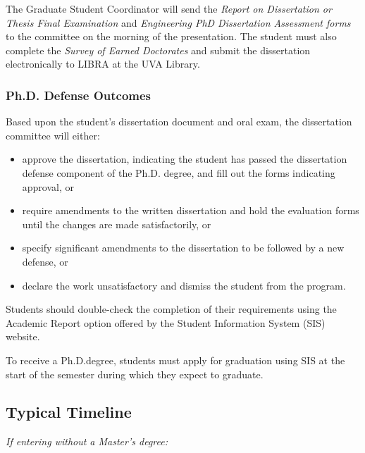The Graduate Student Coordinator will send the \emph{Report on
Dissertation or Thesis Final Examination} and \emph{Engineering PhD
Dissertation Assessment forms} to the committee on the morning of the
presentation\emph{.} The student must also complete the \emph{Survey of
Earned Doctorates} and submit the dissertation electronically to
LIBRA at the UVA Library.

\hypertarget{phd-defense-outcomes}{
\subsubsection{Ph.D. Defense Outcomes}
\label{phd-defense-outcomes}
}

Based upon the student's dissertation document and oral exam, the
dissertation committee will either:

\begin{itemize}[nosep]
\item
  approve the dissertation, indicating the student has passed the
  dissertation defense component of the Ph.D. degree, and fill out the
  forms indicating approval, or
\item
  require amendments to the written dissertation and hold the evaluation
  forms until the changes are made satisfactorily, or
\item
  specify significant amendments to the dissertation to be followed by a
  new defense, or
\item
  declare the work unsatisfactory and dismiss the student from the
  program.
\end{itemize}

Students should double-check the completion of their requirements
using the Academic Report option offered by the Student Information
System (SIS) website.

To receive a Ph.D.degree, students must apply for graduation using SIS at
the start of the semester during which they expect to graduate.

\hypertarget{typical-timeline-phd}{
\subsection{Typical Timeline}
\label{typical-timeline-phd}
}

\emph{If entering without a Master's degree:}

